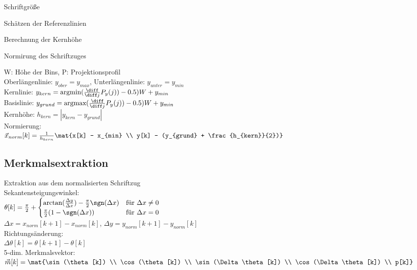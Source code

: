 \documentclass[german,color,6pt]{latex4ei/latex4ei_sheet}
\begin{document}
\begin{sectionbox}
			\begin{cookbox}{Schriftgröße}
				\item Schätzen der Referenzlinien
				\item Berechnung der Kernhöhe
				\item Normirung des Schriftzuges
			\end{cookbox}

			W: Höhe der Bins, P: Projektionsprofil\\
			Oberlängenlinie: $y_{ober} = y_{max}$, Unterlängenlinie: $y_{unter} = y_{min}$\\
			Kernlinie: $y_{kern}  = \text{argmin}(\frac{\diff}{\diff j}P_y(j))-0.5)W+ y_{min}$\\
			Basislinie: $y_{grund} = \text{argmax}(\frac{\diff}{\diff j}P_y(j))-0.5)W+ y_{min}$\\
			Kernhöhe: $h_{kern} = |y_{kern}-y_{grund}|$\\
			Normierung:\\
			$\vec x_{norm}[k] = \frac{1}{h_{kern}} \mat{x[k] - x_{min} \\ y[k] - (y_{grund} + \frac{h_{kern}}{2})}$

\end{sectionbox}

\begin{sectionbox}
	\subsection{Merkmalsextraktion}
		Extraktion aus dem normalisierten Schriftzug\\
		Sekantensteigungswinkel:\\
		$\theta[k] = \frac{\pi}{2} + \begin{cases}\arctan(\frac{\Delta y}{\Delta x}) - \frac{\pi}{2} \sgn(\Delta x) & \text{für } \Delta x \neq 0\\
								     \frac{\pi}{2} (1- \sgn(\Delta x) ) & \text{für } \Delta x = 0 \end{cases}$\\
$\Delta x = x_{norm}[k+1]-x_{norm}[k]$, $\Delta y = y_{norm}[k+1]-y_{norm}[k]$\\
		Richtungsänderung:\\
		$\Delta \theta[k] = \theta[k+1]-\theta[k]$\\
		5-dim. Merkmalsvektor:
		$\vec m[k] = \mat{\sin(\theta[k]) \\ \cos(\theta[k]) \\ \sin(\Delta \theta[k]) \\ \cos(\Delta \theta[k]) \\ p[k]}$

\end{sectionbox}
\end{document}

